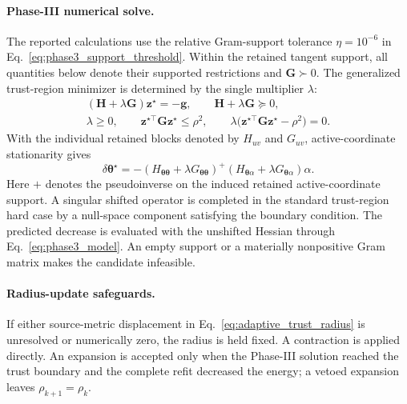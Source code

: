 \documentclass[
  reprint,
  amsmath,
  amssymb,
  aps,
  pra,
  nofootinbib,
  superscriptaddress,
  floatfix
]{revtex4-2}
\begin{document}
\paragraph*{Phase-III numerical solve.}
The reported calculations use the relative Gram-support tolerance
\(\eta=10^{-6}\) in Eq.~\eqref{eq:phase3_support_threshold}. Within the
retained tangent support, all quantities below denote their supported
restrictions and \(\mathbf G\succ0\). The generalized trust-region minimizer is
determined by the single multiplier \(\lambda\):
\begin{equation*}
\begin{gathered}
(\mathbf H+\lambda\mathbf G)\mathbf z^\star=-\mathbf g,
\qquad
\mathbf H+\lambda\mathbf G\succeq0,\\
\lambda\ge0,
\qquad
\mathbf z^{\star\top}\mathbf G\mathbf z^\star\le\rho^2,
\qquad
\lambda\bigl(\mathbf z^{\star\top}\mathbf G\mathbf z^\star-\rho^2\bigr)=0.
\end{gathered}
\end{equation*}
With the individual retained blocks denoted by \(H_{uv}\) and \(G_{uv}\),
active-coordinate stationarity gives
\begin{equation}
\delta\boldsymbol{\theta}^{\star}
=
-\left(
H_{\boldsymbol\theta\boldsymbol\theta}
+\lambda G_{\boldsymbol\theta\boldsymbol\theta}
\right)^{+}
\left(
H_{\boldsymbol\theta\alpha}
+\lambda G_{\boldsymbol\theta\alpha}
\right)\alpha .
\label{eq:phase3_ansatz_response}
\end{equation}
Here \(+\) denotes the pseudoinverse on the induced retained
active-coordinate support. A singular shifted operator is completed in the
standard trust-region hard case by a null-space component satisfying the
boundary condition.
The predicted decrease is evaluated with the unshifted Hessian through
Eq.~\eqref{eq:phase3_model}. An empty support or a materially nonpositive Gram
matrix makes the candidate infeasible.

\paragraph*{Radius-update safeguards.}
If either source-metric displacement in
Eq.~\eqref{eq:adaptive_trust_radius} is unresolved or numerically zero, the
radius is held fixed. A contraction is applied directly. An expansion is
accepted only when the Phase-III solution reached the trust
boundary and the complete refit decreased the energy; a vetoed expansion
leaves \(\rho_{k+1}=\rho_k\).
\end{document}

